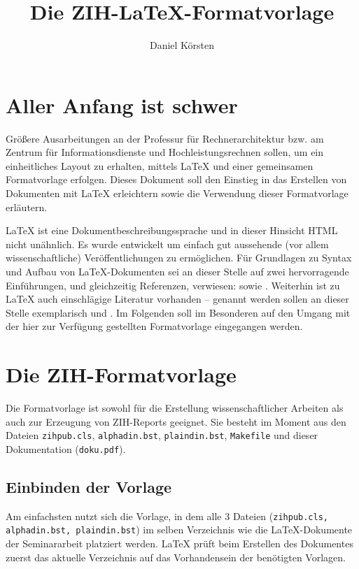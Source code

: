 \documentclass[plainarticle,zihtitle,german,final,hyperref,utf8]{zihpub}
\author{Daniel Körsten}
\title{Die ZIH-\LaTeX-Formatvorlage}
\begin{document}
\section{Aller Anfang ist schwer}
Gr\"o{\ss}ere Ausarbeitungen an der Professur f\"ur Rechnerarchitektur bzw. am Zentrum f\"ur Informationsdienste und Hochleistungsrechnen sollen, um ein einheitliches Layout zu erhalten, mittels {\LaTeX} und einer gemeinsamen Formatvorlage erfolgen. 
Dieses Dokument soll den Einstieg in das Erstellen von Dokumenten mit {\LaTeX} erleichtern sowie die Verwendung dieser Formatvorlage erl\"autern.

{\LaTeX} ist eine Dokumentbeschreibungssprache und in dieser Hinsicht HTML nicht un\"ahnlich. 
Es wurde entwickelt um einfach gut aussehende (vor allem wissenschaftliche) Ver\"offentlichungen zu erm\"oglichen. 
F\"ur Grundlagen zu Syntax und Aufbau von {\LaTeX}-Dokumenten sei an dieser Stelle auf zwei hervorragende Einf\"uhrungen, und gleichzeitig Referenzen, verwiesen: \cite{kochbuch} sowie \cite{rudl}. 
Weiterhin ist zu {\LaTeX} auch einschl\"agige Literatur vorhanden -- genannt werden sollen an dieser Stelle exemplarisch \cite{begleiter} und \cite{kopka}. 
Im Folgenden soll im Besonderen auf den Umgang mit der hier zur Verf\"ugung gestellten Formatvorlage eingegangen werden.

\section{Die ZIH-Formatvorlage}
Die Formatvorlage ist sowohl f\"ur die Erstellung wissenschaftlicher Arbeiten als auch zur Erzeugung von ZIH-Reports geeignet. 
Sie besteht im Moment aus den Dateien \texttt{zihpub.cls}, \texttt{alphadin.bst}, \texttt{plaindin.bst}, \texttt{Makefile} und dieser Dokumentation (\texttt{doku.pdf}).


\subsection{Einbinden der Vorlage}
Am einfachsten nutzt sich die Vorlage, in dem alle 3 Dateien (\texttt{zihpub.cls, alphadin.bst, plaindin.bst}) im selben Verzeichnis wie die {\LaTeX}-Dokumente der Seminararbeit platziert werden. 
{\LaTeX} pr\"uft beim Erstellen des Dokumentes zuerst das aktuelle Verzeichnis auf das Vorhandensein der ben\"otigten Vorlagen.
\end{document}
